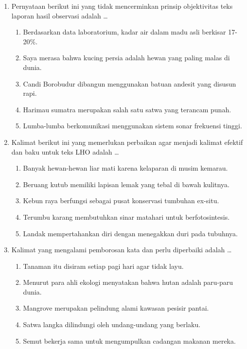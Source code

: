 \documentclass[12pt,a4paper]{article}
\begin{document}
\begin{enumerate}[leftmargin=*]
\item Pernyataan berikut ini yang tidak mencerminkan prinsip objektivitas teks laporan hasil observasi adalah \dots
    \begin{enumerate}[label=\alph*.]
        \item Berdasarkan data laboratorium, kadar air dalam madu asli berkisar 17-20\%.
        \item Saya merasa bahwa kucing persia adalah hewan yang paling malas di dunia.
        \item Candi Borobudur dibangun menggunakan batuan andesit yang disusun rapi.
        \item Harimau sumatra merupakan salah satu satwa yang terancam punah.
        \item Lumba-lumba berkomunikasi menggunakan sistem sonar frekuensi tinggi.
    \end{enumerate}

\item Kalimat berikut ini yang memerlukan perbaikan agar menjadi kalimat efektif dan baku untuk teks LHO adalah \dots
    \begin{enumerate}[label=\alph*.]
        \item Banyak hewan-hewan liar mati karena kelaparan di musim kemarau.
        \item Beruang kutub memiliki lapisan lemak yang tebal di bawah kulitnya.
        \item Kebun raya berfungsi sebagai pusat konservasi tumbuhan ex-situ.
        \item Terumbu karang membutuhkan sinar matahari untuk berfotosintesis.
        \item Landak mempertahankan diri dengan menegakkan duri pada tubuhnya.
    \end{enumerate}

\item Kalimat yang mengalami pemborosan kata dan perlu diperbaiki adalah \dots
    \begin{enumerate}[label=\alph*.]
        \item Tanaman itu disiram setiap pagi hari agar tidak layu.
        \item Menurut para ahli ekologi menyatakan bahwa hutan adalah paru-paru dunia.
        \item Mangrove merupakan pelindung alami kawasan pesisir pantai.
        \item Satwa langka dilindungi oleh undang-undang yang berlaku.
        \item Semut bekerja sama untuk mengumpulkan cadangan makanan mereka.
    \end{enumerate}



\end{enumerate}
\end{document}
